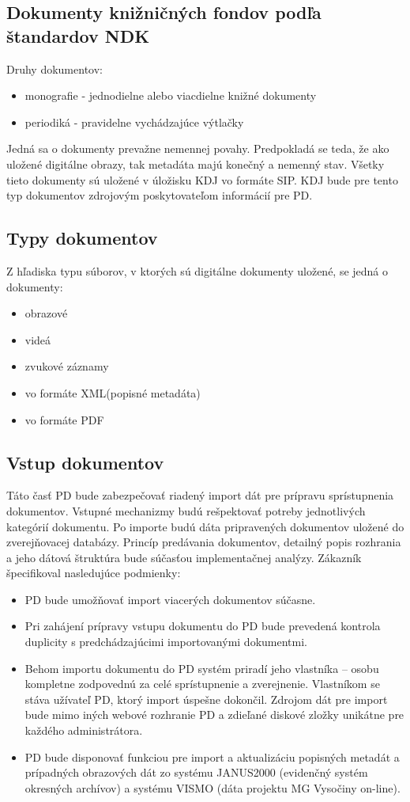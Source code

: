 \documentclass[
  digital, %
  table,   %
  lof,     %
  lot,     %
]{fithesis3}
\begin{document}
\subsection{Dokumenty knižničných fondov podľa štandardov NDK}
Druhy dokumentov:
\begin{itemize}
	\item monografie - jednodielne alebo viacdielne knižné dokumenty			
	\item periodiká - pravidelne vychádzajúce výtlačky
\end{itemize}
Jedná sa o dokumenty prevažne nemennej povahy. Predpokladá se teda, že ako uložené digitálne obrazy, tak metadáta majú konečný a nemenný stav. Všetky tieto dokumenty sú uložené v úložisku KDJ vo formáte SIP. KDJ bude pre tento typ dokumentov zdrojovým poskytovateľom informácií pre PD. 
\subsection{Typy dokumentov} 
Z hľadiska typu súborov, v ktorých sú digitálne dokumenty uložené, se jedná o dokumenty:
\begin{itemize}
	\item obrazové			
	\item videá
	\item zvukové záznamy
	\item vo formáte XML(popisné metadáta)		
	\item vo formáte PDF
\end{itemize}
\subsection{Vstup dokumentov} 
Táto časť PD bude zabezpečovať riadený import dát pre prípravu sprístupnenia dokumentov. Vstupné mechanizmy budú rešpektovať potreby jednotlivých kategórií dokumentu. Po importe budú dáta pripravených dokumentov uložené do zverejňovacej databázy. Princíp predávania dokumentov, detailný popis rozhrania a jeho dátová štruktúra bude súčasťou implementačnej analýzy. Zákazník špecifikoval nasledujúce podmienky:
\begin{itemize}
	\item PD bude umožňovať import viacerých dokumentov súčasne.
	\item Pri zahájení prípravy vstupu dokumentu do PD bude prevedená kontrola duplicity s predchádzajúcimi importovanými dokumentmi.
	\item Behom importu dokumentu do PD systém priradí jeho vlastníka – osobu kompletne zodpovednú za celé sprístupnenie a zverejnenie. Vlastníkom se stáva užívateľ PD, ktorý import úspešne dokončil. Zdrojom dát pre import bude mimo iných webové rozhranie PD a zdieľané diskové zložky unikátne pre každého administrátora.
	\item PD bude disponovať funkciou pre import a aktualizáciu popisných metadát a prípadných obrazových dát zo systému JANUS2000 (evidenčný systém okresných archívov) a systému VISMO (dáta projektu MG Vysočiny on-line).
\end{itemize}
\end{document}
